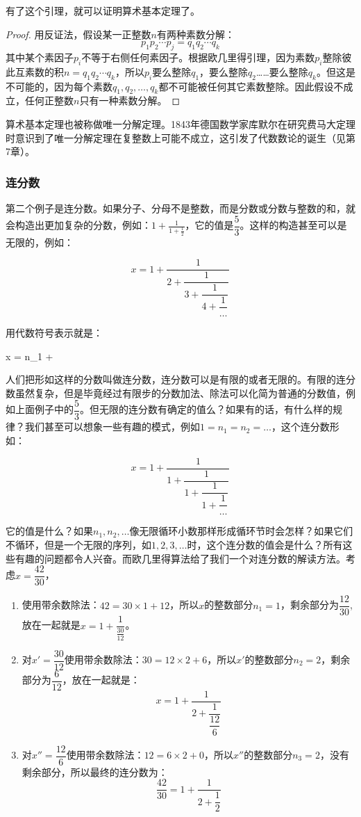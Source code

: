 \documentclass[b5paper]{ctexart}
\begin{document}
有了这个引理，就可以证明算术基本定理了。

\begin{proof}
用反证法，假设某一正整数$n$有两种素数分解：
\[
p_1 p_2 \dotsm p_j = q_1 q_2 \dotsm q_k
\]
其中某个素因子$p_i$不等于右侧任何素因子。根据欧几里得引理，因为素数$p_i$整除彼此互素数的积$n = q_1 q_2 \dotsm q_k$，所以$p_i$要么整除$q_1$，要么整除$q_2$……要么整除$q_k$。但这是不可能的，因为每个素数$q_1, q_2, \dotsc, q_k$都不可能被任何其它素数整除。因此假设不成立，任何正整数$n$只有一种素数分解。
\end{proof}

算术基本定理也被称做唯一分解定理。1843年德国数学家库默尔在研究费马大定理时意识到了唯一分解定理在复整数上可能不成立，这引发了代数数论的诞生（见第7章）。

\subsubsection{连分数}
第二个例子是连分数。如果分子、分母不是整数，而是分数或分数与整数的和，就会构造出更加复杂的分数，例如：$1 + \frac{1}{1 + \frac{1}{2}}$，它的值是$\dfrac{5}{3}$。这样的构造甚至可以是无限的，例如：

\[
x = 1 + \dfrac{1}{2 + \dfrac{1}{3 + \dfrac{1}{4 + \dfrac{1}{\dotso}}}}
\]

用代数符号表示就是：

\be
x = n_1 + 
\ee

人们把形如这样的分数叫做连分数，连分数可以是有限的或者无限的。有限的连分数虽然复杂，但是毕竟经过有限步的分数加法、除法可以化简为普通的分数值，例如上面例子中的$\dfrac{5}{3}$。但无限的连分数有确定的值么？如果有的话，有什么样的规律？我们甚至可以想象一些有趣的模式，例如$1 = n_1 = n_2 = \dotso $，这个连分数形如：

\[
x = 1 + \dfrac{1}{1 + \dfrac{1}{1 + \dfrac{1}{1 + \dfrac{1}{\dotso}}}}
\]

它的值是什么？如果$n_1, n_2, \dotsc$像无限循环小数那样形成循环节时会怎样？如果它们不循环，但是一个无限的序列，如$1, 2, 3, \dotso$时，这个连分数的值会是什么？所有这些有趣的问题都令人兴奋。而欧几里得算法给了我们一个对连分数的解读方法。考虑$x = \dfrac{42}{30}$，

\begin{enumerate}[第1步，]
\item 使用带余数除法：$42 = 30 \times 1 + 12$，所以$x$的整数部分$n_1 = 1$，剩余部分为$\dfrac{12}{30}$, 放在一起就是$x = 1 + \dfrac{1}{\frac{30}{12}}$。
\item 对$x' = \dfrac{30}{12}$使用带余数除法：$30 = 12 \times 2 + 6$，所以$x'$的整数部分$n_2 = 2$，剩余部分为$\dfrac{6}{12}$，放在一起就是：
\[
x = 1 + \dfrac{1}{2 + \dfrac{1}{\dfrac{12}{6}}}
\]
\item 对$x'' = \dfrac{12}{6}$使用带余数除法：$12 = 6 \times 2 + 0$，所以$x''$的整数部分$n_3 = 2$，没有剩余部分，所以最终的连分数为：
\[
\dfrac{42}{30} = 1 + \dfrac{1}{2 + \dfrac{1}{2}}
\]
\end{enumerate}
\end{document}
